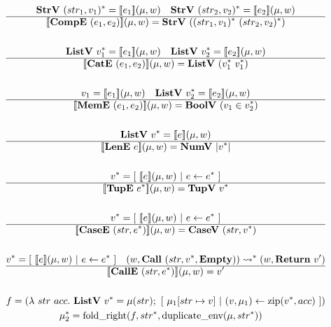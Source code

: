 \begin{gather*}
  \strv ~ \seq{(str_1, v_1)} = \sem{e_1}(\mu, w) \quad
  \strv ~ \seq{(str_2, v_2)} = \sem{e_2}(\mu, w) \\
  \hline
  \sem{\compe ~ (e_1, e_2)}(\mu, w) = \strv ~ (\seq{(str_1, v_1)} ~ \seq{(str_2, v_2)}) \\
%
\newline \\
  \listv ~ \seq{v_1} = \sem{e_1}(\mu, w) \quad
  \listv ~ \seq{v_2} = \sem{e_2}(\mu, w) \\
  \hline
  \sem{\cate ~ (e_1, e_2)}(\mu, w) = \listv ~ (\seq{v_1} ~ \seq{v_1}) \\
%
\newline \\
  v_1 = \sem{e_1}(\mu, w) \quad
  \listv ~ \seq{v_2} = \sem{e_2}(\mu, w) \\
  \hline
  \sem{\meme ~ (e_1, e_2)}(\mu, w) = \boolv ~ (v_1 \in \seq{v_2}) \\
%
\newline \\
  \listv ~ \seq{v} = \sem{e}(\mu, w) \\
  \hline
  \sem{\lene ~ e}(\mu, w) = \numv ~ |\seq v| \\
%
\newline \\
  \seq{v} = [ ~ \sem{e}(\mu, w) ~ | ~ e \leftarrow \seq e ~ ] \\
  \hline
  \sem{\tupe ~ \seq{e}}(\mu, w) = \tupv ~ \seq{v} \\
%
\newline \\
  \seq{v} = [ ~ \sem{e}(\mu, w) ~ | ~ e \leftarrow \seq e ~ ] \\
  \hline
  \sem{\casee ~ (str, \seq{e})}(\mu, w) = \casev ~ (str, \seq{v}) \\
%
\newline \\
  \seq{v} = [ ~ \sem{e}(\mu, w) ~ | ~ e \leftarrow \seq e ~ ] \quad
  (w, \call ~ (str, \seq v, \mt)) \seq{\leadsto} (w, \ret ~ v') \\
  \hline
  \sem{\calle ~ (str, \seq{e})}(\mu, w) = v' \\
%
\newline \\
  f =
    (\lambda ~ str ~ acc. ~
      \listv ~ \seq v = \mu(str); ~
      [ ~ \mu_1[str \mapsto v] ~ | ~ (v, \mu_1) \leftarrow \zip (\seq v, acc) ~ ]
    )
  \\
  \seq{\mu_2} = \foldright(f, \seq{str}, \duplicateenv(\mu, \seq{str})) \quad

\end{gather*}
